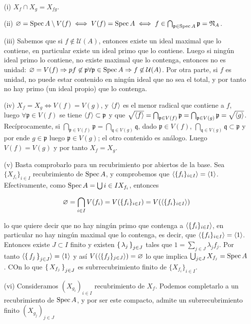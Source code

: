 \documentclass[../main.tex]{subfiles}
\begin{document}
(i) $X_f \cap X_g = X_{fg}$.

(ii) $\varnothing = \operatorname{Spec} A \setminus V(f) \iff V(f) = \operatorname{Spec} A \iff f \in \bigcap_{\mathfrak p \in \operatorname{Spec} A} \mathfrak p = \mathfrak N_A$.

(iii) Sabemos que si $f\not\in \mathcal U(A)$, entonces existe un ideal maximal que lo contiene, en particular existe un ideal primo que lo contiene. Luego si ningún ideal primo lo contiene, no existe maximal que lo contenga, entonces no es unidad:  $\varnothing = V(f) \Rightarrow pf \not \in \mathfrak p \forall \mathfrak p \in \operatorname{Spec} A \Rightarrow f \not\in \mathcal U(A)$. Por otra parte, si $f$ es unidad, no puede estar contenido en ningún ideal que no sea el total, y por tanto no hay primo (un ideal propio) que lo contenga.

(iv) $X_f = X_g \iff V(f) = V(g)$, y $\langle f \rangle$ es el menor radical que contiene a $f$, luego $\forall \mathfrak p \in V(f)$ se tiene $\langle f \rangle \subset \mathfrak p$ y que $\sqrt{\langle f \rangle} = \bigcap_{\mathfrak p \in V(f)} \mathfrak p = \bigcap_{\mathfrak p \in V(g)} \mathfrak{p} = \sqrt{\langle g \rangle}$.
Recíprocamente, si $\bigcap_{\mathfrak p \in V(f)} \mathfrak p = \bigcap_{\mathfrak q \in V(g)} \mathfrak{q}$, dado $\mathfrak p \in V(f)$, $ \bigcap_{\mathfrak{q} \in V(g)} \mathfrak{q} \subset \mathfrak{p}$ y por ende $g \in \mathfrak p$ luego $\mathfrak p \in V(g)$; el otro contenido es análogo. Luego $V(f) = V(g)$ y por tanto $X_f = X_g$.

(v) Basta comprobarlo para un recubrimiento por abiertos de la base. Sea $\{X_{f_i}\}_{i\in I}$ recubrimiento de $\operatorname{Spec} A$, y comprobemos que $\langle \{f_i\}_{i\in I} \rangle = \langle 1 \rangle$. Efectivamente, como $\operatorname{Spec} A = \bigcup{i\in I}X_{f_i} $, entonces

\begin{equation}
  \varnothing = \bigcap_{i\in I} V(f_i) = V(\{f_i\}_{i\in I}) = V(\langle \{f_i\}_{i\in I} \rangle)
\end{equation}

lo que quiere decir que no hay ningún primo que contenga a $\langle \{f_i\}_{i\in I} \rangle$, en particular no hay ningún maximal que lo contenga, es decir, que $\langle \{f_i\}_{i\in I} \rangle = \langle 1 \rangle$. Entonces existe $J\subset I$ finito y existen $\set{\lambda_j}_{j\in J}$ tales que $1 = \sum_{j\in J} \lambda_j f_j$.
Por tanto $\langle  \set{f_j}_{j\in J} \rangle = \langle  1 \rangle$ y así  $V(\langle \{f_j\}_{j\in J} \rangle )= \varnothing$ lo que implica $\bigcup_{j\in J} X_{f_j} = \operatorname{Spec} A$. COn lo que $\set{X_{f_j}}_{j\in J}$ es subrrecubrimiento finito de $\{X_{f_i}\}_{i\in I}$.

(vi) Consideramos $(X_{g_i})_{i\in I}$ recubrimiento de $X_f$. Podemos completarlo a un recubrimiento de $\operatorname{Spec} A$, y por ser este compacto, admite un subrrecubrimiento finito $(X_{g_j})_{j\in J}$
\end{document}
